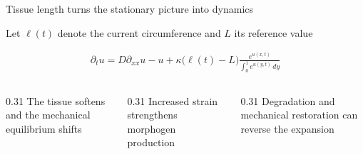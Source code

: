 \begin{frame}{Tissue length turns the stationary picture into dynamics}

  \vspace{-0.18cm}

  {\color{HydraMuted}\fontsize{7.6}{9.3}\selectfont
    Let $\ell(t)$ denote the current circumference and $L$ its reference value
  \par}

  \vspace{-0.22cm}

  {\color{HydraWhite}\bfseries\fontsize{10.2}{12.9}\selectfont
  \begin{align*}
    \boxed{
      \partial_tu
      =
      D\partial_{xx}u-u
      +\kappa\bigl(\ell(t)-L\bigr)
      \frac{e^{u(x,t)}}{\int_0^1e^{u(y,t)}\,dy}
    }
  \end{align*}
  }

  \vspace{0.24cm}

  \begin{columns}[T,onlytextwidth]
    \begin{column}{0.31\textwidth}
        {The tissue softens and the mechanical equilibrium shifts}
    \end{column}
    \begin{column}{0.31\textwidth}
        {Increased strain strengthens morphogen production}
    \end{column}
    \begin{column}{0.31\textwidth}
        {Degradation and mechanical restoration can reverse the expansion}
    \end{column}
  \end{columns}

  \

\end{frame}


